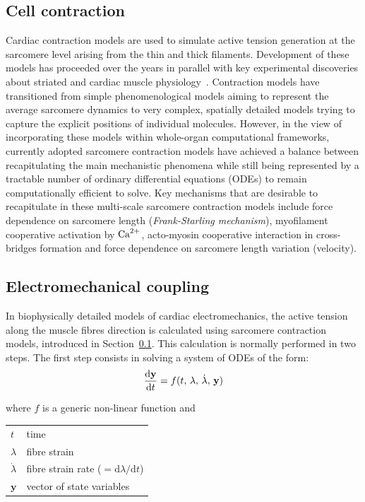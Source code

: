 \subsection{Cell contraction}\label{sec:cell_contr_modelling}
Cardiac contraction models are used to simulate active tension generation at the sarcomere level arising from the thin and thick filaments. Development of these models has proceeded over the years in parallel with key experimental discoveries about striated and cardiac muscle physiology~\cite{Niederer:2019}. Contraction models have transitioned from simple phenomenological models aiming to represent the average sarcomere dynamics to very complex, spatially detailed models trying to capture the explicit positions of individual molecules. However, in the view of incorporating these models within whole-organ computational frameworks, currently adopted sarcomere contraction models have achieved a balance between recapitulating the main mechanistic phenomena while still being represented by a tractable number of ordinary differential equations (\acs{ODE}s) to remain computationally efficient to solve. Key mechanisms that are desirable to recapitulate in these multi-scale sarcomere contraction models include force dependence on sarcomere length (\textit{Frank-Starling mechanism}), myofilament cooperative activation by $\textrm{Ca}^{2+}$, acto-myosin cooperative interaction in cross-bridges formation and force dependence on sarcomere length variation (velocity).


%
%
%
\subsection{Electromechanical coupling}\label{sec:mathelecmechcoupl}
In biophysically detailed models of cardiac electromechanics, the active tension along the muscle fibres direction is calculated using sarcomere contraction models, introduced in Section~\ref{sec:cell_contr_modelling}. This calculation is normally performed in two steps. The first step consists in solving a system of ODEs of the form:
%
\begin{equation}\label{eq:epmechcoupling}
    \dfrac{\mathrm{d}{\mathbf{y}}}{\mathrm{d}{t}} = f(t,\,\lambda,\,\dot{\lambda},\,\mathbf{y}) 
\end{equation}

\noindent
where $f$ is a generic non-linear function and

\vspace{0.2cm}
\begin{tabular}{ll}
    $t$             & time \\
    $\lambda$       & fibre strain \\
    $\dot{\lambda}$ & fibre strain rate ($=\mathrm{d}\lambda / \mathrm{d}t$) \\
    $\mathbf{y}$    & vector of state variables
\end{tabular}


